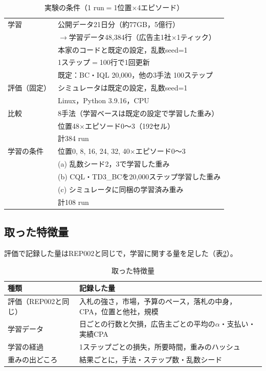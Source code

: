 \documentclass[twocolumn, 10pt]{ujarticle}
\begin{document}
\begin{table}[H]
\centering
\caption{実験の条件（1 run$=$1位置$\times$4エピソード）}
\label{tab:cond}
\footnotesize
\begin{tabularx}{\linewidth}{@{}l>{\raggedright\arraybackslash}X@{}}
\toprule
学習 & 公開データ21日分（約77GB，5億行） \\
 & $\rightarrow$学習データ48,384行（広告主1社$\times$1ティック） \\
 & 本家のコードと既定の設定，乱数seed=1 \\
 & 1ステップ$=$100行で1回更新 \\
 & 既定：BC・IQL 20,000，他の3手法 100ステップ \\
\midrule
評価（固定） & シミュレータは既定の設定，乱数seed=1 \\
 & Linux，Python 3.9.16，CPU \\
\midrule
比較 & 8手法（学習ベースは既定の設定で学習した重み） \\
 & 位置48$\times$エピソード0〜3（192セル） \\
 & 計384 run \\
\midrule
学習の条件 & 位置0, 8, 16, 24, 32, 40$\times$エピソード0〜3 \\
 & (a) 乱数シード2，3で学習した重み \\
 & (b) CQL・TD3\_BCを20,000ステップ学習した重み \\
 & (c) シミュレータに同梱の学習済み重み \\
 & 計108 run \\
\bottomrule
\end{tabularx}
\end{table}

\subsection{取った特徴量}\label{sec:e-feat}

評価で記録した量はREP002と同じで，学習に関する量を足した（表\ref{tab:feat}）。

\begin{table}[H]
\centering
\caption{取った特徴量}
\label{tab:feat}
\footnotesize
\begin{tabularx}{\linewidth}{@{}l>{\raggedright\arraybackslash}X@{}}
\toprule
種類 & 記録した量 \\
\midrule
評価（REP002と同じ） & 入札の強さ，市場，予算のペース，落札の中身，CPA，位置と他社，規模 \\
学習データ & 日ごとの行数と欠損，広告主ごとの平均の$\alpha$・支払い・実績CPA \\
学習の経過 & 1ステップごとの損失，所要時間，重みのハッシュ \\
重みの出どころ & 結果ごとに，手法・ステップ数・乱数シード \\
\bottomrule
\end{tabularx}
\end{table}
\end{document}
